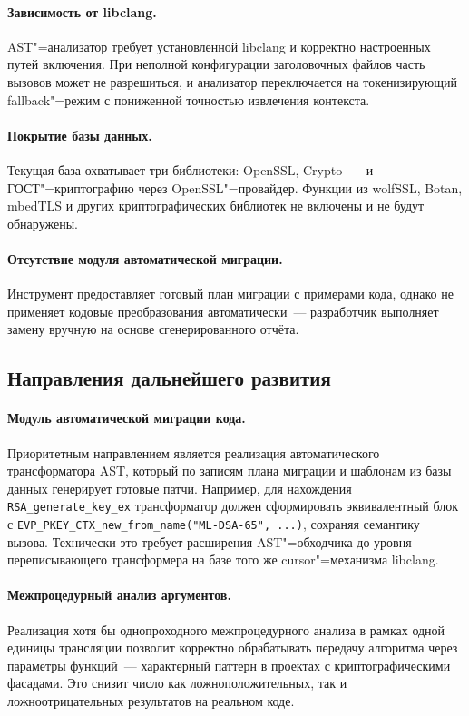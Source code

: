 \paragraph{Зависимость от libclang.}
AST"=анализатор требует установленной libclang и корректно
настроенных путей включения.
При неполной конфигурации заголовочных файлов часть вызовов
может не разрешиться, и анализатор переключается на
токенизирующий fallback"=режим с пониженной точностью
извлечения контекста.

\paragraph{Покрытие базы данных.}
Текущая база охватывает три библиотеки: OpenSSL, Crypto++
и ГОСТ"=криптографию через OpenSSL"=провайдер.
Функции из wolfSSL, Botan, mbedTLS и других криптографических
библиотек не включены и не будут обнаружены.

\paragraph{Отсутствие модуля автоматической миграции.}
Инструмент предоставляет готовый план миграции с примерами кода,
однако не применяет кодовые преобразования автоматически~---
разработчик выполняет замену вручную на основе сгенерированного
отчёта.

\subsection{Направления дальнейшего развития}

\paragraph{Модуль автоматической миграции кода.}
Приоритетным направлением является реализация
автоматического трансформатора AST, который по записям плана
миграции и шаблонам из базы данных генерирует готовые патчи.
Например, для нахождения \texttt{RSA\_generate\_key\_ex}
трансформатор должен сформировать эквивалентный блок с
\texttt{EVP\_PKEY\_CTX\_new\_from\_name("ML-DSA-65",~...)},
сохраняя семантику вызова.
Технически это требует расширения AST"=обходчика до уровня
переписывающего трансформера на базе того же cursor"=механизма
libclang.

\paragraph{Межпроцедурный анализ аргументов.}
Реализация хотя бы однопроходного межпроцедурного анализа
в рамках одной единицы трансляции позволит корректно обрабатывать
передачу алгоритма через параметры функций~--- характерный
паттерн в проектах с криптографическими фасадами.
Это снизит число как ложноположительных, так и
ложноотрицательных результатов на реальном коде.

